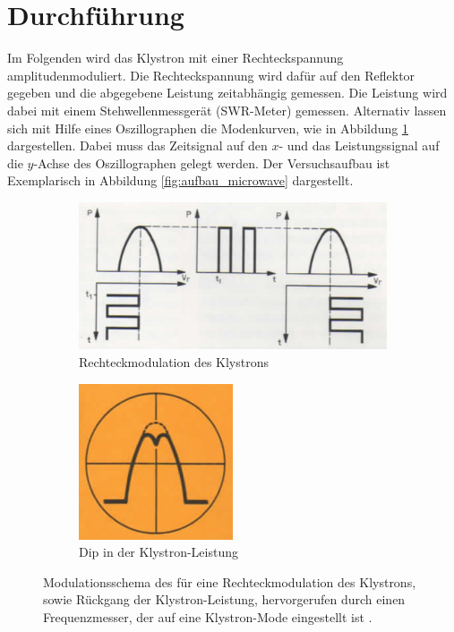 \section{Durchführung}
Im Folgenden wird das Klystron mit einer Rechteckspannung amplitudenmoduliert.
Die Rechteckspannung wird dafür auf den Reflektor gegeben und die abgegebene
Leistung zeitabhängig gemessen.
Die Leistung wird dabei mit einem Stehwellenmessgerät (SWR-Meter) gemessen.
Alternativ lassen sich mit Hilfe eines Oszillographen die Modenkurven, wie in
Abbildung \ref{fig:moden} dargestellen.
Dabei muss das Zeitsignal auf den $x$- und das Leistungssignal auf die
$y$-Achse des Oszillographen gelegt werden.
Der Versuchsaufbau ist Exemplarisch in Abbildung \ref{fig:aufbau_microwave}
dargestellt.
\begin{figure}[p]
    \centering
    \begin{subfigure}{0.6\linewidth}
        \centering
        \includegraphics[width=0.8\linewidth]{img/moden.png}
        \caption{
            Rechteckmodulation des Klystrons
        }
        \label{fig:moden}
    \end{subfigure}
    \begin{subfigure}{0.39\linewidth}
        \centering
        \includegraphics[width=0.8\linewidth]{img/dip.png}
        \caption{
            Dip in der Klystron-Leistung
        }
        \label{fig:dip}
    \end{subfigure}
    \caption{
        Modulationsschema des für eine Rechteckmodulation des Klystrons,
        sowie Rückgang der Klystron-Leistung, hervorgerufen durch einen
        Frequenzmesser, der auf eine Klystron-Mode eingestellt ist
        \cite{V53}.
    }
    \label{fig:moden-dip}
\end{figure}
